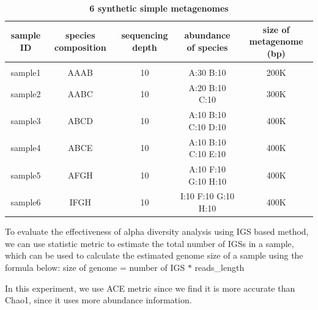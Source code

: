 \begin{table}[!ht]
\caption{
\bf{6 synthetic simple metagenomes}
}
\begin{tabular}{ |c | c |c| c|c| }
sample ID & species composition & sequencing depth & abundance of species & size of metagenome (bp)\\
\hline \\
sample1        & AAAB & 10 & A:30 B:10 & 200K\\
sample2        & AABC & 10 & A:20 B:10 C:10 & 300K\\
sample3        & ABCD & 10 & A:10 B:10 C:10 D:10 & 400K\\
sample4        & ABCE & 10 & A:10 B:10 C:10 E:10 & 400K\\
sample5        & AFGH & 10 & A:10 F:10 G:10 H:10 & 400K\\
sample6        & IFGH & 10 & I:10 F:10 G:10 H:10 & 400K\\

\end{tabular}
\begin{flushleft}
\end{flushleft}
\label{table:simulated_metag}
\end{table}

To evaluate the effectiveness of alpha diversity analysis using IGS based method,
we can use statistic metric to estimate the total number of IGSs in a sample, 
which can be used to calculate the estimated genome size of a sample using the 
formula below: size of genome = number of IGS $*$ reads\_length

In this experiment, we use ACE metric since we find it is more accurate than 
Chao1, since it uses more abundance information.


